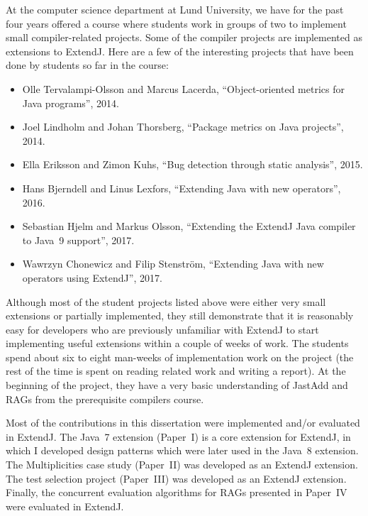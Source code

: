 \documentclass[10pt, twoside, openright]{book}
\begin{document}
At the computer science department at Lund University, we have for the past four
years offered a course where students work in groups of two to implement
small compiler-related projects. Some of the compiler projects are
implemented as extensions to ExtendJ. Here are a few of the interesting
projects that have been done by students so far in the course:

\begin{itemize}\raggedright
\item 
  Olle Tervalampi-Olsson and Marcus Lacerda,
  ``Object-oriented metrics for Java programs'',
  2014.
\item
  Joel Lindholm and Johan Thorsberg,
  ``Package metrics on Java projects'',
  2014.
\item
  Ella Eriksson and Zimon Kuhs,
  ``Bug detection through static analysis'',
  2015.
\item
  Hans Bjerndell and Linus Lexfors,
  ``Extending Java with new operators'',
  2016.
\item
  Sebastian Hjelm and Markus Olsson,
  ``Extending the ExtendJ Java compiler to Java~9 support'',
  2017.
\item
  Wawrzyn Chonewicz and Filip Stenström,
  ``Extending Java with new operators using ExtendJ'',
  2017.
\end{itemize}

Although most of the student projects listed above were either very small
extensions or partially implemented, they still demonstrate that it is
reasonably easy for developers who are previously unfamiliar with ExtendJ
to start implementing useful extensions within a couple of weeks of work. The students spend about
six to eight man-weeks of implementation work on the project (the rest of the time is spent on
reading related work and writing a report). At the beginning of the project,
they have a very basic understanding of JastAdd and RAGs from the prerequisite
compilers course.

Most of the contributions in this dissertation were implemented and/or evaluated in ExtendJ.
The Java~7 extension (Paper~I) is a core extension for ExtendJ, in which I developed
design patterns which were later used in the Java~8 extension.
The Multiplicities case study (Paper~II) was developed as an ExtendJ extension.
The test selection project (Paper~III) was developed as an ExtendJ extension.
Finally, the concurrent evaluation algorithms for RAGs presented in Paper~IV were
evaluated in ExtendJ.

\end{document}
